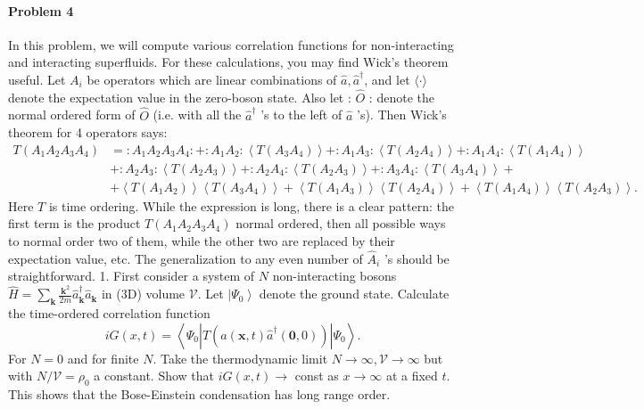 \documentclass[hyperref, a4paper]{article}
\begin{document}
\paragraph{Problem 4} In this problem, we will compute various correlation functions for non-interacting and interacting superfluids. For these calculations, you may find Wick's theorem useful. Let $A_i$ be operators which are linear combinations of $\hat{a}, \hat{a}^{\dagger}$, and let $\langle\cdot\rangle$ denote the expectation value in the zero-boson state. Also let : $\hat{O}$ : denote the normal ordered form of $\hat{O}$ (i.e. with all the $\hat{a}^{\dagger}$ 's to the left of $\hat{a}$ 's). Then Wick's theorem for 4 operators says:
$$
\begin{aligned}
T\left(A_1 A_2 A_3 A_4\right) &=: A_1 A_2 A_3 A_4:+: A_1 A_2:\left\langle T\left(A_3 A_4\right)\right\rangle+: A_1 A_3:\left\langle T\left(A_2 A_4\right)\right\rangle+: A_1 A_4:\left\langle T\left(A_1 A_4\right)\right\rangle \\
&+: A_2 A_3:\left\langle T\left(A_2 A_3\right)\right\rangle+: A_2 A_4:\left\langle T\left(A_2 A_3\right)\right\rangle+: A_3 A_4:\left\langle T\left(A_3 A_4\right)\right\rangle+\\
&+\left\langle T\left(A_1 A_2\right)\right\rangle\left\langle T\left(A_3 A_4\right)\right\rangle+\left\langle T\left(A_1 A_3\right)\right\rangle\left\langle T\left(A_2 A_4\right)\right\rangle+\left\langle T\left(A_1 A_4\right)\right\rangle\left\langle T\left(A_2 A_3\right)\right\rangle .
\end{aligned}
$$
Here $T$ is time ordering.
While the expression is long, there is a clear pattern: the first term is the product $T\left(A_1 A_2 A_3 A_4\right)$ normal ordered, then all possible ways to normal order two of them, while the other two are replaced by their expectation value, etc. The generalization to any even number of $\hat{A}_i$ 's should be straightforward.
1. First consider a system of $N$ non-interacting bosons $\hat{H}=\sum_{\mathbf{k}} \frac{\mathbf{k}^2}{2 m} \hat{a}_{\mathbf{k}}^{\dagger} \hat{a}_{\mathbf{k}}$ in (3D) volume $\mathcal{V}$. Let $\left|\Psi_0\right\rangle$ denote the ground state. Calculate the time-ordered correlation function
$$
i G(x, t)=\left\langle\Psi_0\left|T\left(\hat{a}(\mathbf{x}, t) \hat{a}^{\dagger}(\mathbf{0}, 0)\right)\right| \Psi_0\right\rangle .
$$
For $N=0$ and for finite $N$. Take the thermodynamic limit $N \rightarrow \infty, \mathcal{V} \rightarrow \infty$ but with $N / \mathcal{V}=\rho_0$ a constant. Show that $i G(x, t) \rightarrow$ const as $x \rightarrow \infty$ at a fixed $t$. This shows that the Bose-Einstein condensation has long range order.
\end{document}
